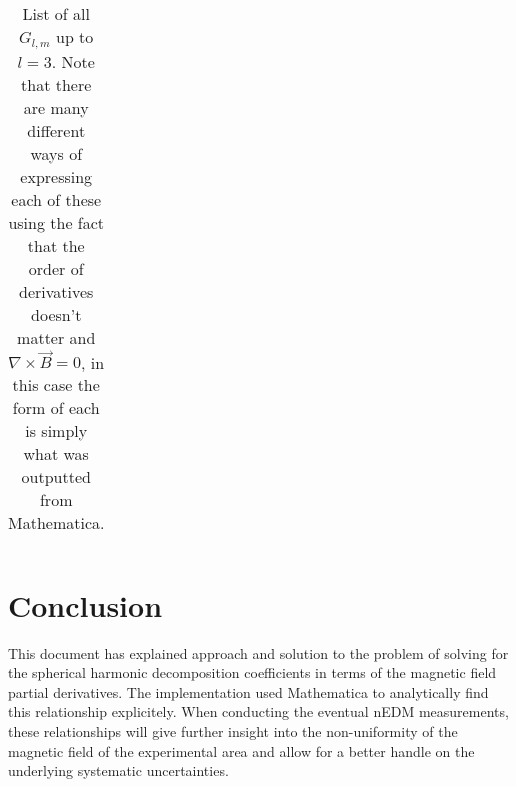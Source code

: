 \documentclass{article}
\begin{document}
{\begin{table}[h!]
\begin{center}
\begin{tabular}{ |c|c|c| }
        \hline
    \end{tabular}
\end{center}
\caption{List of all $G_{l, m}$ up to $l=3$. Note that there are many different ways of expressing each of these using the fact that the order of derivatives doesn't matter and $\nabla\times\vec B=0$, in this case the form of each is simply what was outputted from Mathematica. }
\label{glmtable}
\end{table}
}

\section{Conclusion}

This document has explained approach and solution to the problem of solving for the spherical harmonic decomposition coefficients in terms of the magnetic field partial derivatives. The implementation used Mathematica to analytically find this relationship explicitely. When conducting the eventual nEDM measurements, these relationships will give further insight into the non-uniformity of the magnetic field of the experimental area and allow for a better handle on the underlying systematic uncertainties. 

\printbibliography
\end{document}
